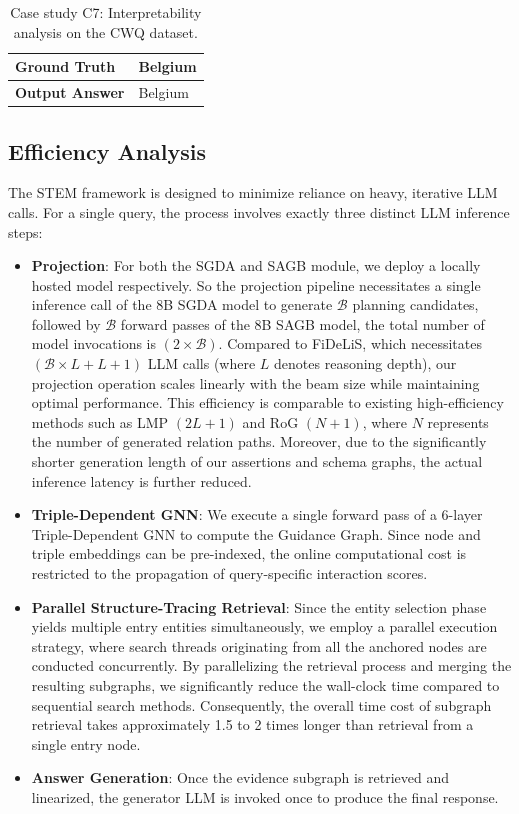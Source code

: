 \documentclass[11pt]{article}
\begin{document}
\begin{table}[htbp]
\begin{tabular}{p{2.5cm}|p{11.5cm}}
\hline

\textbf{Ground Truth} & 
Belgium \\

\hline

\textbf{Output Answer} & 
Belgium \\
\hline
\end{tabular}
\caption{Case study C7: Interpretability analysis on the CWQ dataset.}
\label{tab:c7}
\end{table}

\subsection{Efficiency Analysis}
\label{sec:ea}
The STEM framework is designed to minimize reliance on heavy, iterative LLM calls. For a single query, the process involves exactly three distinct LLM inference steps: 
\begin{itemize}
\item\textbf{Projection}: For both the SGDA and SAGB module, we deploy a locally hosted model respectively. So the projection pipeline necessitates a single inference call of the 8B SGDA model to generate \( \mathcal{B} \) planning candidates, followed by \( \mathcal{B} \) forward passes of the 8B SAGB model, the total number of model invocations is \( (2 \times \mathcal{B}) \). Compared to FiDeLiS, which necessitates $(\mathcal{B}×L+L+1)$ LLM calls (where $L$ denotes reasoning depth), our projection operation scales linearly with the beam size while maintaining optimal performance. This efficiency is comparable to existing high-efficiency methods such as LMP $(2L+1)$ \cite{wan-etal-2025-digest} and RoG $(N+1)$, where $N$ represents the number of generated relation paths. Moreover, due to the significantly shorter generation length of our assertions and schema graphs, the actual inference latency is further reduced.

\item\textbf{Triple-Dependent GNN}: We execute a single forward pass of a 6-layer Triple-Dependent GNN to compute the Guidance Graph. Since node and triple embeddings can be pre-indexed, the online computational cost is restricted to the propagation of query-specific interaction scores. 
\item\textbf{Parallel Structure-Tracing Retrieval}: Since the entity selection phase yields multiple entry entities simultaneously, we employ a parallel execution strategy, where search threads originating from all the anchored nodes are conducted concurrently. By parallelizing the retrieval process and merging the resulting subgraphs, we significantly reduce the wall-clock time compared to sequential search methods. Consequently, the overall time cost of subgraph retrieval takes approximately 1.5 to 2 times longer than retrieval from a single entry node.
\item\textbf{Answer Generation}: Once the evidence subgraph is retrieved and linearized, the generator LLM is invoked once to produce the final response. 
\end{itemize}
\end{document}
